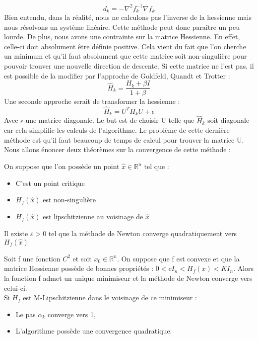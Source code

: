 \begin{equation}
d_k = -\nabla^2f_k^{-1}\nabla f_k
\end{equation}
Bien entendu, dans la réalité, nous ne calculons pas l'inverse de la hessienne mais nous résolvons un système linéaire. Cette méthode peut donc paraître un peu lourde. De plus, nous avons une contrainte sur la matrice Hessienne. En effet, celle-ci doit absolument être définie positive. Cela vient du fait que l'on cherche un minimum et qu'il faut absolument que cette matrice soit non-singulière pour pouvoir trouver une nouvelle direction de descente. Si cette matrice ne l'est pas, il est possible de la modifier par l'approche de Goldfeld, Quandt et Trotter : 
\begin{equation}
\hat{H}_k = \frac{H_k + \beta I}{1 + \beta}
\end{equation}
Une seconde approche serait de transformer la hessienne  : 
\begin{equation}
\hat{H}_k = U^TH_kU + \epsilon
\end{equation}
Avec $\epsilon$ une matrice diagonale. Le but est de choisir U telle que $\hat{H}_k$ soit diagonale car cela simplifie les calculs de l'algorithme. Le problème de cette dernière méthode est qu'il faut beaucoup de temps de calcul pour trouver la matrice U. \\

Nous allons énoncer deux théorèmes sur la convergence de cette méthode : 

\begin{theoreme}
On suppose que l'on possède un point $\hat{x} \in \mathbb{R}^n$ tel que : 
\begin{itemize}
	\item C'est un point critique
	\item $H_f(\hat{x})$ est non-singulière
	\item $H_f(\hat{x})$ est lipschitzienne au voisinage de $\hat{x}$
\end{itemize}
Il existe $\varepsilon > 0$ tel que la méthode de Newton converge quadratiquement vers $H_f(\hat{x})$
\end{theoreme}

\begin{theoreme}
Soit f une fonction $C^2$ et soit $x_0 \in \mathbb{R}^n$. On suppose que f est convexe et que la matrice Hessienne possède de bonnes propriétés :  $ 0 < cI_n < H_f(x) < KI_n$. Alors la fonction f admet un unique minimiseur et la méthode de Newton converge vers celui-ci.\\
Si $H_f$ est M-Lipschitzienne dans le voisinage de ce minimiseur : 
\begin{itemize}
	\item Le pas $\alpha_k$ converge vers 1,
	\item L'algorithme possède une convergence quadratique.
\end{itemize}
\end{theoreme}

